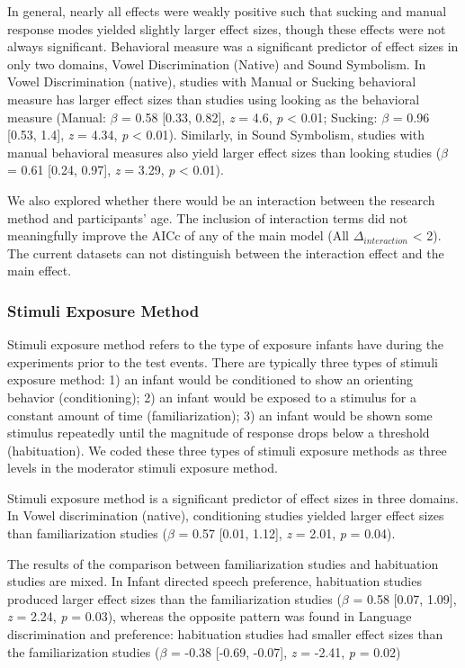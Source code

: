 \documentclass[10pt, letterpaper]{article}
\begin{document}
In general, nearly all effects were weakly positive such that sucking
and manual response modes yielded slightly larger effect sizes, though
these effects were not always significant. Behavioral measure was a
significant predictor of effect sizes in only two domains, Vowel
Discrimination (Native) and Sound Symbolism. In Vowel Discrimination
(native), studies with Manual or Sucking behavioral measure has larger
effect sizes than studies using looking as the behavioral measure
(Manual: \(\beta\) = 0.58 {[}0.33, 0.82{]}, \emph{z} = 4.6, \emph{p}
\textless{} 0.01; Sucking: \(\beta\) = 0.96 {[}0.53, 1.4{]}, \emph{z} =
4.34, \emph{p} \textless{} 0.01). Similarly, in Sound Symbolism, studies
with manual behavioral measures also yield larger effect sizes than
looking studies (\(\beta\) = 0.61 {[}0.24, 0.97{]}, \emph{z} = 3.29,
\emph{p} \textless{} 0.01).

We also explored whether there would be an interaction between the
research method and participants' age. The inclusion of interaction
terms did not meaningfully improve the AICc of any of the main model
(All \(\Delta_{interaction}\) \textless{} 2). The current datasets can
not distinguish between the interaction effect and the main effect.

\hypertarget{stimuli-exposure-method}{%
\subsubsection{Stimuli Exposure Method}\label{stimuli-exposure-method}}

Stimuli exposure method refers to the type of exposure infants have
during the experiments prior to the test events. There are typically
three types of stimuli exposure method: 1) an infant would be
conditioned to show an orienting behavior (conditioning); 2) an infant
would be exposed to a stimulus for a constant amount of time
(familiarization); 3) an infant would be shown some stimulus repeatedly
until the magnitude of response drops below a threshold (habituation).
We coded these three types of stimuli exposure methods as three levels
in the moderator stimuli exposure method.

Stimuli exposure method is a significant predictor of effect sizes in
three domains. In Vowel discrimination (native), conditioning studies
yielded larger effect sizes than familiarization studies (\(\beta\) =
0.57 {[}0.01, 1.12{]}, \emph{z} = 2.01, \emph{p} = 0.04).

The results of the comparison between familiarization studies and
habituation studies are mixed. In Infant directed speech preference,
habituation studies produced larger effect sizes than the
familiarization studies (\(\beta\) = 0.58 {[}0.07, 1.09{]}, \emph{z} =
2.24, \emph{p} = 0.03), whereas the opposite pattern was found in
Language discrimination and preference: habituation studies had smaller
effect sizes than the familiarization studies (\(\beta\) = -0.38
{[}-0.69, -0.07{]}, \emph{z} = -2.41, \emph{p} = 0.02)
\end{document}
